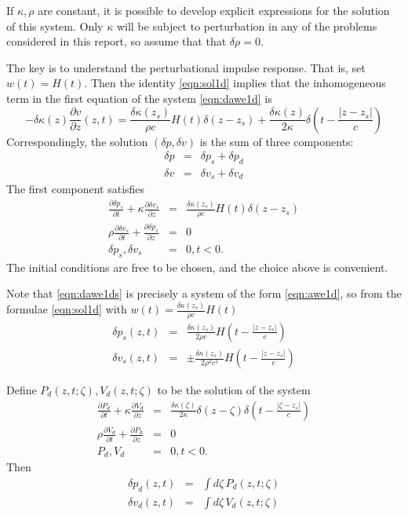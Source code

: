 If $\kappa, \rho $ are constant, it is possible to develop explicit
expressions for the solution of this system. Only $\kappa$ will be
subject to perturbation in any of the problems considered in this
report, so assume that that $\delta\rho=0$.

The key is to understand the perturbational impulse response. That is,
set $w(t)=H(t)$. Then the identity \ref{eqn:sol1d} implies that the
inhomogeneous term in the first equation of the system \ref{eqn:dawe1d}
is 
\begin{equation}
  \label{eqn:pertrhs}
-\delta \kappa(z) \frac{\partial v}{\partial z}(z,t) = \frac{\delta
  \kappa(z_s)}{\rho c}H(t)\delta(z-z_s) +
\frac{\delta\kappa(z)}{2\kappa}\delta\left(t - \frac{|z-z_s|}{c}\right)
\end{equation}
Correspondingly, the solution $(\delta p, \delta v)$ is the sum of
three components:
\begin{eqnarray}
  \label{eqn:pertrhsterms}
  \delta p & = & \delta p_s + \delta p_d \nonumber\\
  \delta v & = & \delta v_s + \delta v_d 
\end{eqnarray}
The first component satisfies
\begin{eqnarray}
  \label{eqn:dawe1ds}
  \frac{\partial \delta p_s}{\partial t} +\kappa\frac{\partial
  \delta v_s}{\partial z}   &=&  \frac{\delta
  \kappa(z_s)}{\rho c}H(t)\delta(z-z_s)\nonumber\\
  \rho \frac{\partial \delta v_s}{\partial t} + \frac{\partial \delta p_s}{\partial
  z}&=&0\nonumber\\
  \delta p_s,\delta v_s&=&0, t < 0.
\end{eqnarray}
The initial conditions are free to be chosen, and the choice above is convenient.

Note that \ref{eqn:dawe1ds} is precisely a system of the form
\ref{eqn:awe1d}, so from the formulae \ref{eqn:sol1d} with $w(t)=\frac{\delta
  \kappa(z_s)}{\rho c}H(t)$
\begin{eqnarray}
\label{eqn:dsol1ds}
\delta p_s(z,t) &=& \frac{\delta
  \kappa(z_s)}{2\rho c}H\left(t - \frac{|z-z_s|}{c}\right) \nonumber \\
\delta v_s(z,t) &=& \pm\frac{\delta \kappa(z_s)}{2\rho^2 c^2}H\left(t - \frac{|z-z_s|}{c}\right)
\end{eqnarray}

Define $P_d(z,t;\zeta), V_d(z,t;\zeta)$ to be the solution of the system
\begin{eqnarray}
  \label{eqn:dawe1dd}
  \frac{\partial P_d}{\partial t} +\kappa\frac{\partial
  V_d}{\partial z}   &=&   \frac{\delta\kappa(\zeta)}{2\kappa}\delta(z-\zeta)\delta\left(t - \frac{|\zeta-z_s|}{c}\right)\nonumber\\
  \rho \frac{\partial V_d}{\partial t} + \frac{\partial P_d}{\partial
  z}&=&0\nonumber\\
  P_d,V_d&=&0, t < 0.
\end{eqnarray}
Then
\begin{eqnarray}
  \label{eqn:intrep1}
  \delta p_d(z,t) & = & \int d\zeta\, P_d(z,t;\zeta)\\
  \delta v_d(z,t) & = & \int d\zeta\, V_d(z,t;\zeta)
\end{eqnarray}

